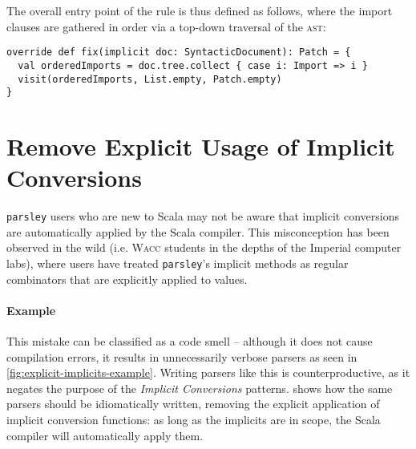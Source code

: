 \documentclass[../../main.tex]{subfiles}
\begin{document}
The overall entry point of the rule is thus defined as follows, where the import clauses are gathered in order via a top-down traversal of the \textsc{ast}:
\begin{verbatim}
override def fix(implicit doc: SyntacticDocument): Patch = {
  val orderedImports = doc.tree.collect { case i: Import => i }
  visit(orderedImports, List.empty, Patch.empty)
}
\end{verbatim}

\section{Remove Explicit Usage of Implicit Conversions}\label{sec:no-explicit-implicits}
\texttt{parsley} users who are new to Scala may not be aware that implicit conversions are automatically applied by the Scala compiler.
This misconception has been observed in the wild (i.e. \textsc{Wacc} students in the depths of the Imperial computer labs), where users have treated \texttt{parsley}'s implicit methods as regular combinators that are explicitly applied to values.

\paragraph{Example}
This mistake can be classified as a code smell -- although it does not cause compilation errors, it results in unnecessarily verbose parsers as seen in \cref{fig:explicit-implicits-example}.
Writing parsers like this is counterproductive, as it negates the purpose of the \emph{Implicit Conversions} patterns.
 shows how the same parsers should be idiomatically written, removing the explicit application of implicit conversion functions: as long as the implicits are in scope, the Scala compiler will automatically apply them.
\end{document}
